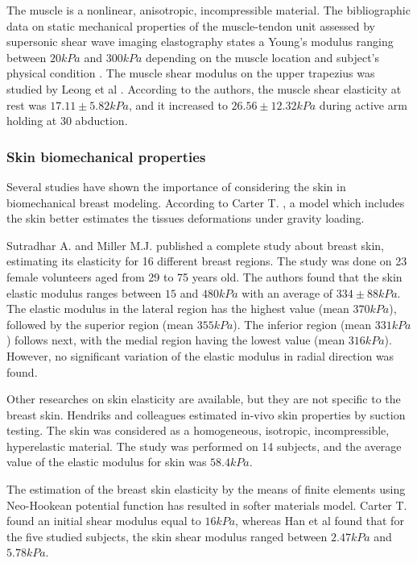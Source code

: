 The muscle is a nonlinear, anisotropic, incompressible material.  The bibliographic data on static mechanical properties of the muscle-tendon unit assessed by supersonic shear wave imaging elastography states a Young's modulus ranging between $20kPa$ and $300kPa$ depending on the muscle location and subject's physical condition \citep{lima_eassessment_2018}.  The muscle shear modulus on the upper trapezius was studied by Leong et al \citep{leong_quantitative_2013}. According to the authors, the muscle shear elasticity at rest was $17.11\pm 5.82 kPa$, and it increased to $26.56\pm 12.32 kPa$ during active arm holding at 30 \textdegree abduction. 

\subsubsection*{Skin biomechanical properties}
Several studies have shown the importance of considering the skin in biomechanical breast modeling. According to Carter T. \citep{carter_biomechanical_2009}, a model which includes the skin better estimates the tissues deformations under gravity loading.

Sutradhar A. and Miller M.J. \citep{sutradhar_vivo_2013} published a complete study about breast skin, estimating its elasticity for 16 different breast regions. The study was done on 23 female volunteers aged from 29 to 75 years old. The authors found that the skin elastic modulus ranges between $15$ and $480 kPa$ with an average of $334\pm 88 kPa$. The elastic modulus in the lateral region has the highest value (mean $370 kPa$), followed by the superior region (mean $355 kPa$). The inferior region (mean $331 kPa$) follows next, with the medial region having the
lowest value (mean $316 kPa$). However, no significant variation of the elastic modulus in radial direction was found. 
 
Other researches on skin elasticity are available, but they are not specific to the breast skin. Hendriks and colleagues \citep{hendriks_relative_2006} estimated in-vivo skin properties by suction testing. The skin was considered as a homogeneous, isotropic, incompressible, hyperelastic material. The study was performed on 14 subjects, and the average value of the elastic modulus for skin was $58.4 kPa$.

The estimation of the breast skin elasticity by the means of finite elements using Neo-Hookean potential function has resulted in softer materials model. Carter T.\citep{carter_determining_2009} found an initial shear modulus equal to $16kPa$, whereas Han et al \citep{han_nonlinear_2014} found that for the five studied subjects, the skin shear modulus ranged between $2.47 kPa$ and $5.78kPa$. 

